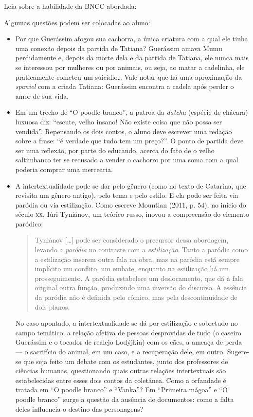 \documentclass[11pt]{extarticle}
\begin{document}
Leia sobre a habilidade da BNCC abordada:

Algumas questões podem ser colocadas ao aluno:

\begin{itemize}
\item Por que Guerássim afogou sua cachorra, a única criatura com a qual ele
tinha uma conexão depois da partida de Tatiana? Guerássim amava Mumu
perdidamente e, depois da morte dela e da partida de Tatiana, ele nunca
mais se interessou por mulheres ou por animais, ou seja, ao matar a
cadelinha, ele praticamente cometeu um suicídio\ldots{} Vale notar que há uma
aproximação da \emph{spaniel} com a criada Tatiana: Guerássim encontra a
cadela após perder o amor de sua vida.

\item Em um trecho de ``O poodle branco'', a patroa da \emph{datcha}
(espécie de chácara) luxuosa diz: ``escute, velho insano! Não existe
coisa que não possa ser vendida''. Repensando os dois contos, o aluno
deve escrever uma redação sobre a frase: ``é verdade que tudo tem um
preço?''. O ponto de partida deve ser uma reflexão, por parte do educando,  acerca do fato de o velho saltimbanco ter se
recusado a vender o cachorro por uma soma com a qual poderia comprar uma
mercearia.

\item A intertextualidade pode se dar pelo gênero (como no texto de
Catarina, que revisita um gênero antigo), pelo tema e pelo estilo. E ela
pode ser feita via paródia ou via estilização. Como escreve Mountian
(2011, p. 54), no início do século \textsc{xx}, Iúri Tyniánov, um teórico russo,
inovou a compreensão do elemento paródico:
\begin{quote}
Tyniánov {[}\ldots{}{]} pode ser considerado o precursor dessa abordagem,
levando a \emph{paródia} no contraste com a \emph{estilização}. Tanto a
paródia como a estilização inserem outra fala na obra, mas na paródia
está sempre implícito um conflito, um embate, enquanto na estilização há
um prosseguimento. A paródia estabelece um deslocamento, que dá à fala
original outra função, produzindo uma inversão do discurso. A essência
da paródia não é definida pelo cômico, mas pela descontinuidade de dois
planos.
\end{quote}


No caso apontado, a intertextualidade se dá por estilização e sobretudo
no campo temático: a relação afetiva de pessoas desprovidas de tudo (o
caseiro Guerássim e o tocador de realejo Lodýjkin) com os cães, a ameaça
de perda --- o sacrifício do animal, em um caso, e a recuperação dele,
em outro. Sugere-se que seja feito um debate com os estudantes, junto dos professores de ciências humanas, questionando quais outras relações intertextuais são estabelecidas
entre esses dois contos da coletânea. Como a orfandade é
tratada em ``O poodle branco'' e ``Vanka''? Em ``Primeira mágoa'' e
``O poodle branco'' surge a questão da ausência de documentos: como a
falta deles influencia o destino das personagens?
\end{itemize}
\end{document}
